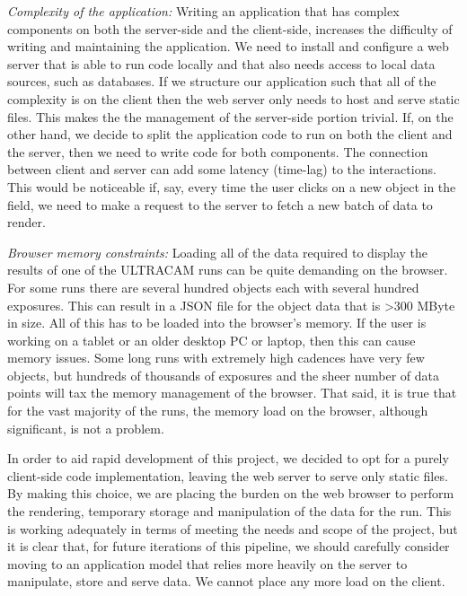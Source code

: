 \emph{Complexity of the application:} Writing an application that has complex components on both the server-side and the client-side, increases the difficulty of writing and maintaining the application. We need to install and configure a web server that is able to run code locally and that also needs access to local data sources, such as databases. If we structure our application such that all of the complexity is on the client then the web server only needs to host and serve static files. This makes the the management of the server-side portion trivial. If, on the other hand, we decide to split the application code to run on both the client and the server, then we need to write code for both components. The connection between client and server can add some latency (time-lag) to the interactions. This would be noticeable if, say, every time the user clicks on a new object in the field, we need to make a request to the server to fetch a new batch of data to render.  

\emph{Browser memory constraints:} Loading all of the data required to display the results of one of the ULTRACAM runs can be quite demanding on the browser. For some runs there are several hundred objects each with several hundred exposures. This can result in a JSON file for the object data that is \textgreater 300 MByte in size. All of this has to be loaded into the browser's memory. If the user is working on a tablet or an older desktop PC or laptop, then this can cause memory issues. Some long runs with extremely high cadences have very few objects, but hundreds of thousands of exposures and the sheer number of data points will tax the memory management of the browser. That said, it is true that for the vast majority of the runs, the memory load on the browser, although significant, is not a problem. 

In order to aid rapid development of this project, we decided to opt for a purely client-side code implementation, leaving the web server to serve only static files. By making this choice, we are placing the burden on the web browser to perform the rendering, temporary storage and manipulation of the data for the run. This is working adequately in terms of meeting the needs and scope of the project, but it is clear that, for future iterations of this pipeline, we should carefully consider moving to an application model that relies more heavily on the server to manipulate, store and serve data. We cannot place any more load on the client. 

